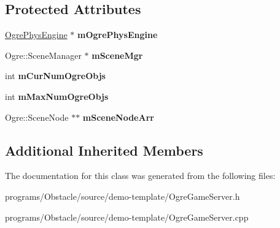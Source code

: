\subsection*{Protected Attributes}
\begin{DoxyCompactItemize}
\item 
\hyperlink{classns__phys_1_1_ogre_phys_engine}{Ogre\+Phys\+Engine} $\ast$ {\bfseries m\+Ogre\+Phys\+Engine}\hypertarget{classns__phys_1_1_ogre_game_server_aa240c64e79a7aaf20ad4a4fec40929f7}{}\label{classns__phys_1_1_ogre_game_server_aa240c64e79a7aaf20ad4a4fec40929f7}

\item 
Ogre\+::\+Scene\+Manager $\ast$ {\bfseries m\+Scene\+Mgr}\hypertarget{classns__phys_1_1_ogre_game_server_a6ff9dedb90c66d74ab2f375d37820aef}{}\label{classns__phys_1_1_ogre_game_server_a6ff9dedb90c66d74ab2f375d37820aef}

\item 
int {\bfseries m\+Cur\+Num\+Ogre\+Objs}\hypertarget{classns__phys_1_1_ogre_game_server_a59023dc2877edd194f74081ab6880473}{}\label{classns__phys_1_1_ogre_game_server_a59023dc2877edd194f74081ab6880473}

\item 
int {\bfseries m\+Max\+Num\+Ogre\+Objs}\hypertarget{classns__phys_1_1_ogre_game_server_a81a11bd1556b827252bc0c8cbaa6e68f}{}\label{classns__phys_1_1_ogre_game_server_a81a11bd1556b827252bc0c8cbaa6e68f}

\item 
Ogre\+::\+Scene\+Node $\ast$$\ast$ {\bfseries m\+Scene\+Node\+Arr}\hypertarget{classns__phys_1_1_ogre_game_server_a325e2c71ca4b7f0753ec6e564fb2cf96}{}\label{classns__phys_1_1_ogre_game_server_a325e2c71ca4b7f0753ec6e564fb2cf96}

\end{DoxyCompactItemize}
\subsection*{Additional Inherited Members}


The documentation for this class was generated from the following files\+:\begin{DoxyCompactItemize}
\item 
programs/\+Obstacle/source/demo-\/template/Ogre\+Game\+Server.\+h\item 
programs/\+Obstacle/source/demo-\/template/Ogre\+Game\+Server.\+cpp\end{DoxyCompactItemize}
